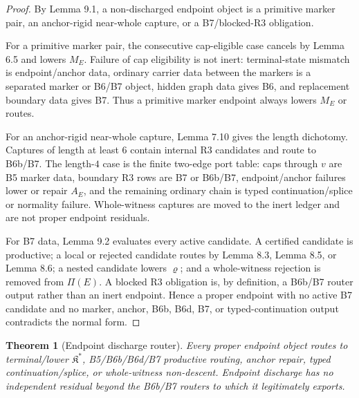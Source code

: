 \documentclass[11pt]{amsart}
\newtheorem{theorem}{Theorem}[section]
\theoremstyle{definition}
\begin{document}
\begin{proof}
By Lemma 9.1, a non-discharged endpoint object is a primitive marker pair, an anchor-rigid near-whole capture, or a B7/blocked-R3 obligation.

For a primitive marker pair, the consecutive cap-eligible case cancels by Lemma 6.5 and lowers \(M_E\). Failure of cap eligibility is not inert: terminal-state mismatch is endpoint/anchor data, ordinary carrier data between the markers is a separated marker or B6/B7 object, hidden graph data gives B6, and replacement boundary data gives B7. Thus a primitive marker endpoint always lowers \(M_E\) or routes.

For an anchor-rigid near-whole capture, Lemma 7.10 gives the length dichotomy. Captures of length at least \(6\) contain internal R3 candidates and route to B6b/B7. The length-\(4\) case is the finite two-edge port table: caps through \(v\) are B5 marker data, boundary R3 rows are B7 or B6b/B7, endpoint/anchor failures lower or repair \(A_E\), and the remaining ordinary chain is typed continuation/splice or normality failure. Whole-witness captures are moved to the inert ledger and are not proper endpoint residuals.

For B7 data, Lemma 9.2 evaluates every active candidate. A certified candidate is productive; a local or rejected candidate routes by Lemma 8.3, Lemma 8.5, or Lemma 8.6; a nested candidate lowers \(\varrho\); and a whole-witness rejection is removed from \(\Pi(E)\). A blocked R3 obligation is, by definition, a B6b/B7 router output rather than an inert endpoint. Hence a proper endpoint with no active B7 candidate and no marker, anchor, B6b, B6d, B7, or typed-continuation output contradicts the normal form.

\end{proof}
\begin{theorem}[Endpoint discharge router]
Every proper endpoint object routes to terminal/lower \(\mathfrak K^\ast\), B5/B6b/B6d/B7 productive routing, anchor repair, typed continuation/splice, or whole-witness non-descent. Endpoint discharge has no independent residual beyond the B6b/B7 routers to which it legitimately exports.

\end{theorem}
\end{document}
